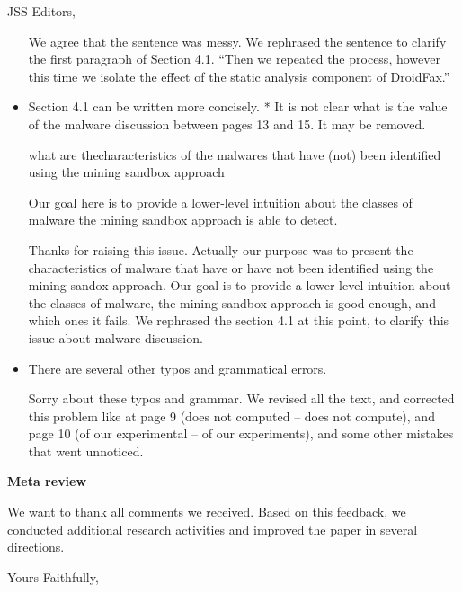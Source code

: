 \documentclass{letter}
\begin{document}
\begin{letter}{JSS Editors,}
\begin{itemize}
{\color{blue}{\bf Answer:} We agree that the sentence was messy. We rephrased the sentence to clarify the first paragraph of Section 4.1. ``Then we repeated the process, however this time we isolate the effect of the static analysis component of DroidFax.''}

\vspace{0.2cm}

\item Section 4.1 can be written more concisely.
* It is not clear what is the value of the malware discussion between pages 13 and 15. It may be removed.


what  are  thecharacteristics  of  the  malwares  that  have  (not)  been  identified  using  the  mining  sandbox  approach

Our goal here is to provide a lower-level intuition about the classes of malware the mining sandbox approach is able to detect.





\vspace{0.2cm}

{\color{blue}{\bf Answer:} Thanks for raising this issue. Actually our purpose was to present the characteristics of malware that have or have not been identified using the mining sandox approach. Our goal is to provide a lower-level intuition about the classes of malware, the mining sandbox approach is good enough, and which ones it fails. We rephrased the section 4.1 at this point, to clarify this issue about malware discussion.}

\vspace{0.2cm}

\item There are several other typos and grammatical errors.


\vspace{0.2cm}

{\color{blue}{\bf Answer:} Sorry about these typos and grammar. We revised all the text, and corrected this problem like at page 9 (does not computed – does not compute), and page 10 (of our experimental – of our experiments), and some other mistakes that went unnoticed.}





\end{itemize}



{\bf Meta review}

We want to thank all comments we received. Based on this feedback, we conducted additional research activities and improved the paper in several directions.

\closing{Yours Faithfully,}


\end{letter}
\end{document}
